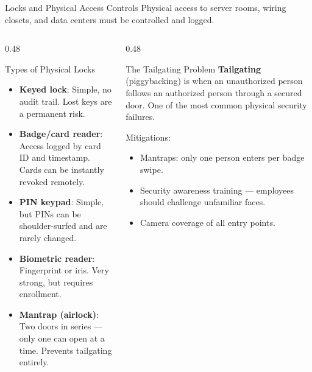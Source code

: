 \documentclass[aspectratio=169]{beamer}  %
\begin{document}
\begin{frame}{Locks and Physical Access Controls}
    \footnotesize
    Physical access to server rooms, wiring closets, and data centers must be controlled and logged.

    \vspace{0.3em}
    \begin{columns}[T]
        \begin{column}{0.48\textwidth}
            \begin{block}{Types of Physical Locks}
                \footnotesize
                \begin{itemize}
                    \item \textbf{Keyed lock}: Simple, no audit trail. Lost keys are a permanent risk.
                    \item \textbf{Badge/card reader}: Access logged by card ID and timestamp. Cards can be instantly revoked remotely.
                    \item \textbf{PIN keypad}: Simple, but PINs can be shoulder-surfed and are rarely changed.
                    \item \textbf{Biometric reader}: Fingerprint or iris. Very strong, but requires enrollment.
                    \item \textbf{Mantrap (airlock)}: Two doors in series --- only one can open at a time. Prevents tailgating entirely.
                \end{itemize}
            \end{block}
        \end{column}
        \begin{column}{0.48\textwidth}
            \begin{exampleblock}{The Tailgating Problem}
                \footnotesize
                \textbf{Tailgating} (piggybacking) is when an unauthorized person follows an authorized person through a secured door. One of the most common physical security failures.

                \vspace{0.2em}
                Mitigations:
                \begin{itemize}
                    \item Mantraps: only one person enters per badge swipe.
                    \item Security awareness training --- employees should challenge unfamiliar faces.
                    \item Camera coverage of all entry points.
                \end{itemize}
            \end{exampleblock}
        \end{column}
    \end{columns}
\end{frame}
\end{document}
